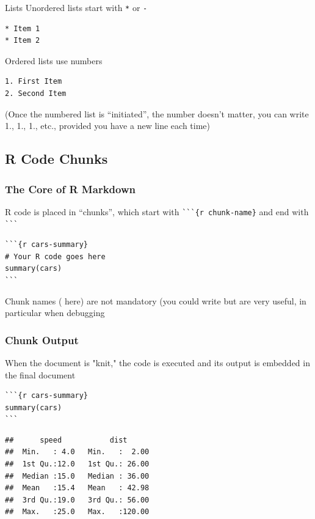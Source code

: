 \documentclass[aspectratio=169]{beamer}\usepackage[]{graphicx}\usepackage[]{xcolor}
\makeatletter
\newenvironment{kframe}{%
 \def\at@end@of@kframe{}%
 \ifinner\ifhmode%
  \def\at@end@of@kframe{\end{minipage}}%
  \begin{minipage}{\columnwidth}%
 \fi\fi%
 \def\FrameCommand##1{\hskip\@totalleftmargin \hskip-\fboxsep
 \colorbox{shadecolor}{##1}\hskip-\fboxsep
     \hskip-\linewidth \hskip-\@totalleftmargin \hskip\columnwidth}%
 \MakeFramed {\advance\hsize-\width
   \@totalleftmargin\z@ \linewidth\hsize
   \@setminipage}}%
 {\par\unskip\endMakeFramed%
 \at@end@of@kframe}
\newenvironment{knitrout}{}{} %
\makeatother
\begin{document}
\begin{frame}[fragile]{Lists}
Unordered lists start with \verb|*| or \verb|-|
\begin{verbatim}
* Item 1
* Item 2
\end{verbatim}
\vfill
Ordered lists use numbers
\begin{verbatim}
1. First Item
2. Second Item
\end{verbatim}
(Once the numbered list is ``initiated'', the number doesn't matter, you can write 1., 1., 1., etc., provided you have a new line each time)
\end{frame}

\subsection{R Code Chunks}

\begin{frame}[fragile]
  \frametitle{The Core of R Markdown}
  R code is placed in ``chunks'', which start with \verb|```{r chunk-name}| and end with \verb|```|
\begin{lstlisting}
```{r cars-summary}
# Your R code goes here
summary(cars)
```
\end{lstlisting}
\vfill
Chunk names ( here) are not mandatory (you could write  but are very useful, in particular when debugging
\end{frame}

\begin{frame}[fragile]
  \frametitle{Chunk Output}
  When the document is "knit," the  code is executed and its output is embedded in the final document
\begin{lstlisting}
```{r cars-summary}
summary(cars)
```
\end{lstlisting}
\begin{knitrout}
\color{fgcolor}\begin{kframe}
\begin{verbatim}
##      speed           dist       
##  Min.   : 4.0   Min.   :  2.00  
##  1st Qu.:12.0   1st Qu.: 26.00  
##  Median :15.0   Median : 36.00  
##  Mean   :15.4   Mean   : 42.98  
##  3rd Qu.:19.0   3rd Qu.: 56.00  
##  Max.   :25.0   Max.   :120.00
\end{verbatim}
\end{kframe}
\end{knitrout}
\end{frame}
\end{document}
